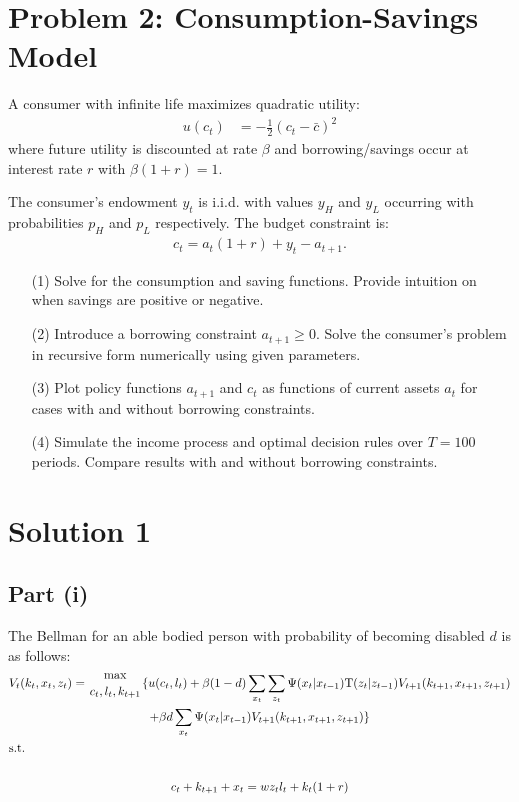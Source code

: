 \documentclass[10pt,a4paper]{article}
\begin{document}
\section*{Problem 2: Consumption-Savings Model}
A consumer with infinite life maximizes quadratic utility:
\begin{align*}
    u(c_t) &= -\frac{1}{2} (c_t - \bar{c})^2
\end{align*}
where future utility is discounted at rate $\beta$ and borrowing/savings occur at interest rate $r$ with $\beta(1+r) = 1$.

The consumer’s endowment $y_t$ is i.i.d. with values $y_H$ and $y_L$ occurring with probabilities $p_H$ and $p_L$ respectively. The budget constraint is:
\begin{align*}
    c_t = a_t(1+r) + y_t - a_{t+1}.
\end{align*}

\begin{enumerate}
    \item[(1)] Solve for the consumption and saving functions. Provide intuition on when savings are positive or negative.
    \item[(2)] Introduce a borrowing constraint $a_{t+1} \geq 0$. Solve the consumer’s problem in recursive form numerically using given parameters.
    \item[(3)] Plot policy functions $a_{t+1}$ and $c_t$ as functions of current assets $a_t$ for cases with and without borrowing constraints.
    \item[(4)] Simulate the income process and optimal decision rules over $T=100$ periods. Compare results with and without borrowing constraints.
\end{enumerate}

\section*{Solution 1}
  \subsection*{Part (i)}
    The Bellman for an able bodied person with probability of becoming disabled $d$ is as follows:
    \begin{gather*}
      V_t(k_t,x_t,z_t) = {\max\atop{c_t,l_t,k_{t+1}}}\{u(c_t,l_t) + 
      \beta(1-d)\sum\limits_{x_t}\sum\limits_{z_t}\Psi(x_t|x_{t-1})
      \text{T}(z_t|z_{t-1})V_{t+1}(k_{t+1},x_{t+1},z_{t+1}) \\
      + \beta d\sum\limits_{x_t}\Psi(x_t|x_{t-1})V_{t+1}(k_{t+1},x_{t+1},z_{t+1})\} \\
      \shortintertext{s.t.} \\
      c_t + k_{t+1} + x_t = wz_tl_t + k_t(1+r) \\
    \end{gather*}
\end{document}
